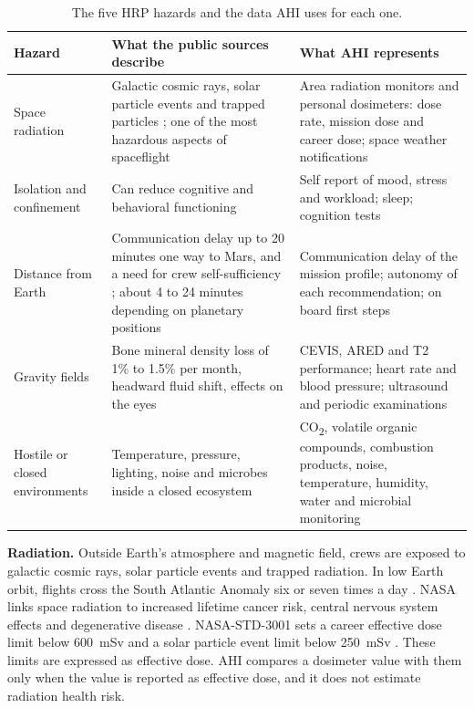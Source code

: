 \begin{table}[htbp]
\centering
\vspace{0.8em}
\caption{The five HRP hazards and the data AHI uses for each one.}
\label{tab:hazards}
\small
\begin{tabular}{p{3.2cm}p{5.6cm}p{5.4cm}}
\hline
\textbf{Hazard} & \textbf{What the public sources describe} & \textbf{What AHI represents} \\
\hline
Space radiation & Galactic cosmic rays, solar particle events and trapped particles \cite{nasa_srag_space_radiation}; one of the most hazardous aspects of spaceflight \cite{nasa_hrp_five_hazards} & Area radiation monitors and personal dosimeters: dose rate, mission dose and career dose; space weather notifications \\
Isolation and confinement & Can reduce cognitive and behavioral functioning \cite{nasa_behavioral_health_risk} & Self report of mood, stress and workload; sleep; cognition tests \\
Distance from Earth & Communication delay up to 20 minutes one way to Mars, and a need for crew self-sufficiency \cite{nasa_hrp_distance_from_earth}; about 4 to 24 minutes depending on planetary positions \cite{nasa_space_communications_seven_things} & Communication delay of the mission profile; autonomy of each recommendation; on board first steps \\
Gravity fields & Bone mineral density loss of 1\% to 1.5\% per month, headward fluid shift, effects on the eyes \cite{nasa_hrp_gravity_fields} & CEVIS, ARED and T2 performance; heart rate and blood pressure; ultrasound and periodic examinations \\
Hostile or closed environments & Temperature, pressure, lighting, noise and microbes inside a closed ecosystem \cite{nasa_hrp_five_hazards} & CO\textsubscript{2}, volatile organic compounds, combustion products, noise, temperature, humidity, water and microbial monitoring \\
\hline
\end{tabular}
\vspace{1.2em}
\end{table}

\medskip\noindent\textbf{Radiation.} Outside Earth's atmosphere and magnetic field, crews are exposed to galactic cosmic rays, solar particle events and trapped radiation. In low Earth orbit, flights cross the South Atlantic Anomaly six or seven times a day \cite{nasa_srag_space_radiation}. NASA links space radiation to increased lifetime cancer risk, central nervous system effects and degenerative disease \cite{nasa_why_space_radiation_matters}. NASA-STD-3001 sets a career effective dose limit below 600~mSv and a solar particle event limit below 250~mSv \cite{nasa_ochmo_tb020_radiation}. These limits are expressed as effective dose. AHI compares a dosimeter value with them only when the value is reported as effective dose, and it does not estimate radiation health risk.

